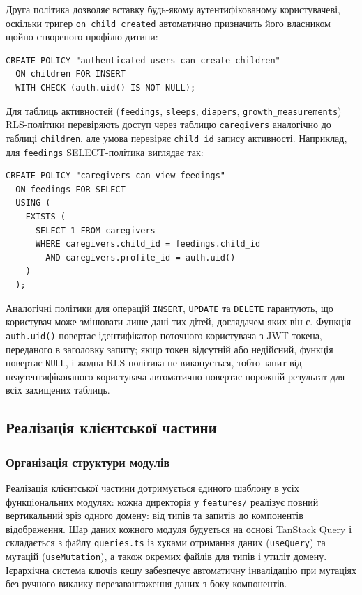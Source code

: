 Друга політика дозволяє вставку будь-якому аутентифікованому користувачеві, оскільки тригер \texttt{on\_child\_created} автоматично призначить його власником щойно створеного профілю дитини:

\begin{verbatim}
CREATE POLICY "authenticated users can create children"
  ON children FOR INSERT
  WITH CHECK (auth.uid() IS NOT NULL);
\end{verbatim}

Для таблиць активностей (\texttt{feedings}, \texttt{sleeps}, \texttt{diapers}, \texttt{growth\_measurements}) \gls{RLS}-політики перевіряють доступ через таблицю \texttt{caregivers} аналогічно до таблиці \texttt{children}, але умова перевіряє \texttt{child\_id} запису активності. Наприклад, для \texttt{feedings} SELECT-політика виглядає так:

\begin{verbatim}
CREATE POLICY "caregivers can view feedings"
  ON feedings FOR SELECT
  USING (
    EXISTS (
      SELECT 1 FROM caregivers
      WHERE caregivers.child_id = feedings.child_id
        AND caregivers.profile_id = auth.uid()
    )
  );
\end{verbatim}

Аналогічні політики для операцій \texttt{INSERT}, \texttt{UPDATE} та \texttt{DELETE} гарантують, що користувач може змінювати лише дані тих дітей, доглядачем яких він є. Функція \texttt{auth.uid()} повертає ідентифікатор поточного користувача з \gls{JWT}-токена, переданого в заголовку запиту; якщо токен відсутній або недійсний, функція повертає \texttt{NULL}, і жодна \gls{RLS}-політика не виконується, тобто запит від неаутентифікованого користувача автоматично повертає порожній результат для всіх захищених таблиць.

\subsection{Реалізація клієнтської частини}

\subsubsection{Організація структури модулів}

Реалізація клієнтської частини дотримується єдиного шаблону в усіх функціональних модулях: кожна директорія у \texttt{features/} реалізує повний вертикальний зріз одного домену: від типів та запитів до компонентів відображення. Шар даних кожного модуля будується на основі TanStack Query і складається з файлу \texttt{queries.ts} із хуками отримання даних (\texttt{useQuery}) та мутацій (\texttt{useMutation}), а також окремих файлів для типів і утиліт домену. Ієрархічна система ключів кешу забезпечує автоматичну інвалідацію при мутаціях без ручного виклику перезавантаження даних з боку компонентів.

